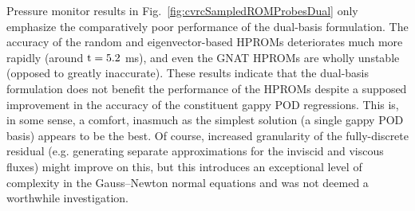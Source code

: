 Pressure monitor results in Fig.~\ref{fig:cvrcSampledROMProbesDual} only emphasize the comparatively poor performance of the dual-basis formulation. The accuracy of the random and eigenvector-based HPROMs deteriorates much more rapidly (around $\text{t} = 5.2$ ms), and even the GNAT HPROMs are wholly unstable (opposed to greatly inaccurate). These results indicate that the dual-basis formulation does not benefit the performance of the HPROMs despite a supposed improvement in the accuracy of the constituent gappy POD regressions. This is, in some sense, a comfort, inasmuch as the simplest solution (a single gappy POD basis) appears to be the best. Of course, increased granularity of the fully-discrete residual (e.g. generating separate approximations for the inviscid and viscous fluxes) might improve on this, but this introduces an exceptional level of complexity in the Gauss--Newton normal equations and was not deemed a worthwhile investigation. 